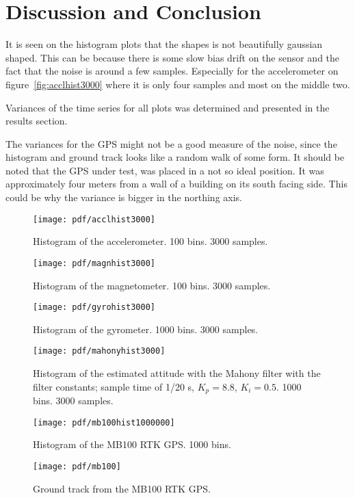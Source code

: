 \section{Discussion and Conclusion}
It is seen on the histogram plots that the shapes is not beautifully
gaussian shaped. This can be because there is some slow bias drift on
the sensor and the fact that the noise is around a few samples.
Especially for the accelerometer on figure~\vref{fig:acclhist3000}
where it is only four samples and most on the middle two.

Variances of the time series for all plots was determined and
presented in the results section.

The variances for the GPS might not be a good measure of the
noise, since the histogram and ground track looks like a random
walk of some form. It should be noted that the GPS under test, was
placed in a not so ideal position. It was approximately four meters
from a wall of a building on its south facing side. This could be
why the variance is bigger in the northing axis.

         
\newpage

\begin{figure}[h]
	\centering
	\texttt{[image: pdf/acclhist3000]}
	\caption{Histogram of the accelerometer. 100 bins. 3000 samples.}
	\label{fig:acclhist3000}
\end{figure}

\begin{figure}[h]
	\centering
	\texttt{[image: pdf/magnhist3000]}
	\caption{Histogram of the magnetometer. 100 bins. 3000 samples.}
	\label{fig:magnhist3000}
\end{figure}

\begin{figure}[h]
	\centering
	\texttt{[image: pdf/gyrohist3000]}
	\caption{Histogram of the gyrometer. 1000 bins. 3000 samples.}
	\label{fig:gyrohist3000}
\end{figure}

\begin{figure}[h]
	\centering
	\texttt{[image: pdf/mahonyhist3000]}
	\caption{Histogram of the estimated attitude with the Mahony filter
	with the filter constants; sample time of 1/20 s, $K_p = 8.8$, $K_i
= 0.5$. 1000 bins. 3000 samples.}
	\label{fig:mahonyhist3000}
\end{figure}

\begin{figure}[h]
	\centering
	\texttt{[image: pdf/mb100hist1000000]}
	\caption{Histogram of the MB100 \ac{RTK} \ac{GPS}. 1000 bins.}
	\label{fig:mb100hist1000000}
\end{figure}

\begin{figure}[h]
	\centering
	\texttt{[image: pdf/mb100]}
	\caption{Ground track from the MB100 \ac{RTK} \ac{GPS}.}
	\label{fig:mb100}
\end{figure}

